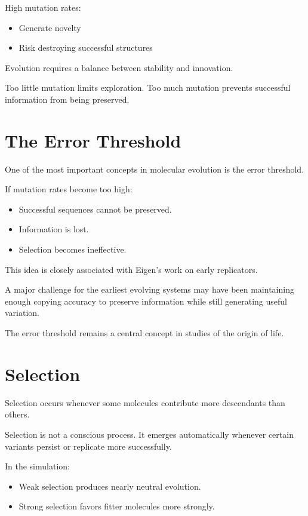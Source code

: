 \documentclass[
  oneside,
  openany]{book}
\providecommand{\tightlist}{%
  \setlength{\itemsep}{0pt}\setlength{\parskip}{0pt}}
\begin{document}
High mutation rates:

\begin{itemize}
\tightlist
\item
  Generate novelty
\item
  Risk destroying successful structures
\end{itemize}

Evolution requires a balance between stability and innovation.

Too little mutation limits exploration. Too much mutation prevents successful information from being preserved.

\section{The Error Threshold}\label{the-error-threshold}

One of the most important concepts in molecular evolution is the error threshold.

If mutation rates become too high:

\begin{itemize}
\tightlist
\item
  Successful sequences cannot be preserved.
\item
  Information is lost.
\item
  Selection becomes ineffective.
\end{itemize}

This idea is closely associated with Eigen's work on early replicators.

A major challenge for the earliest evolving systems may have been maintaining enough copying accuracy to preserve information while still generating useful variation.

The error threshold remains a central concept in studies of the origin of life.

\section{Selection}\label{selection}

Selection occurs whenever some molecules contribute more descendants than others.

Selection is not a conscious process. It emerges automatically whenever certain variants persist or replicate more successfully.

In the simulation:

\begin{itemize}
\tightlist
\item
  Weak selection produces nearly neutral evolution.
\item
  Strong selection favors fitter molecules more strongly.
\end{itemize}
\end{document}

